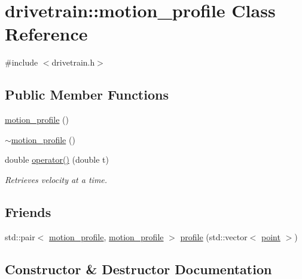 \hypertarget{classdrivetrain_1_1motion__profile}{}\section{drivetrain\+:\+:motion\+\_\+profile Class Reference}
\label{classdrivetrain_1_1motion__profile}


{\ttfamily \#include $<$drivetrain.\+h$>$}

\subsection*{Public Member Functions}
\begin{DoxyCompactItemize}
\item 
\hyperlink{classdrivetrain_1_1motion__profile_a2f660fa3ce88b70c5260a16efaaa269f}{motion\+\_\+profile} ()
\item 
\hyperlink{classdrivetrain_1_1motion__profile_ab822145e3230f6c02d910ea6f27c016c}{$\sim$motion\+\_\+profile} ()
\item 
double \hyperlink{classdrivetrain_1_1motion__profile_ac236edd0c320ee8eb81e7ec969a0862c}{operator()} (double t)
\begin{DoxyCompactList}\small\item\em Retrieves velocity at a time. \end{DoxyCompactList}\end{DoxyCompactItemize}
\subsection*{Friends}
\begin{DoxyCompactItemize}
\item 
std\+::pair$<$ \hyperlink{classdrivetrain_1_1motion__profile}{motion\+\_\+profile}, \hyperlink{classdrivetrain_1_1motion__profile}{motion\+\_\+profile} $>$ \hyperlink{classdrivetrain_1_1motion__profile_a279ebf41f5d3fbf5381a68aff24a0946}{profile} (std\+::vector$<$ \hyperlink{structdrivetrain_1_1point}{point} $>$)
\end{DoxyCompactItemize}


\subsection{Constructor \& Destructor Documentation}
